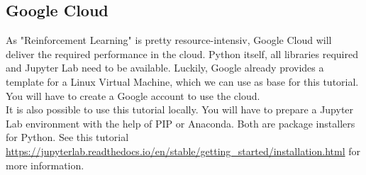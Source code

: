 \documentclass[a4paper]{article}
\begin{document}
\subsection{Google Cloud}
As "Reinforcement Learning" is pretty resource-intensiv, Google Cloud will deliver the required performance in the cloud. Python itself, all libraries required and Jupyter Lab need to be available. Luckily, Google already provides a template for a Linux Virtual Machine, which we can use as base for this tutorial. You will have to create a Google account to use the cloud.\\
It is also possible to use this tutorial locally. You will have to prepare a Jupyter Lab environment with the help of PIP or Anaconda. Both are package installers for Python. See this tutorial \url{https://jupyterlab.readthedocs.io/en/stable/getting_started/installation.html} for more information.
\end{document}

